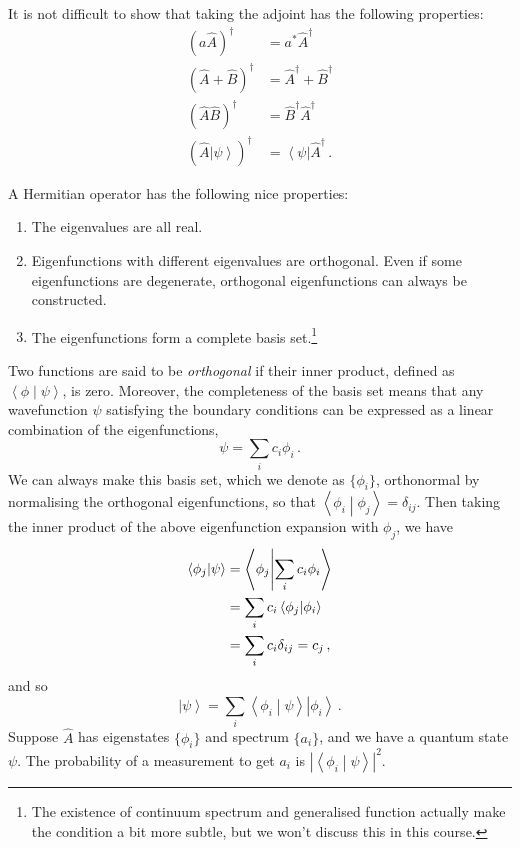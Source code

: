 \documentclass{article}
\theoremstyle{plain}\theoremheaderfont{\normalfont\itshape}\theorembodyfont{\rmfamily}\theoremseparator{.}\newtheorem*{rem}{Remark}\newtheorem*{ex}{Example}\newtheorem*{proof}{Proof}\newtheorem*{altp}{Alternative proof}
\theoremstyle{plain}\theoremheaderfont{\normalfont\bfseries}\theorembodyfont{\rmfamily}\theoremseparator{.}\newtheorem{thm}{Theorem}[section]\newtheorem{lem}[thm]{Lemma}\newtheorem{prop}[thm]{Proposition}\newtheorem*{cor}{Corollary}\newtheorem{defn}[thm]{Definition}\newtheorem{clm}[thm]{Claim}\newtheorem{clminproof}{Claim}
\theoremstyle{break}\theoremheaderfont{\normalfont\itshape}\theorembodyfont{\rmfamily}\theoremseparator{.\medskip}\newtheorem*{proofskip}{Proof}\newtheorem*{exs}{Examples}\newtheorem*{rems}{Remarks}
\theoremstyle{break}\theoremheaderfont{\normalfont\bfseries}\theorembodyfont{\rmfamily}\theoremseparator{.\medskip}\newtheorem{lemskip}[thm]{Lemma}\newtheorem{defnskip}[thm]{Definition}\newtheorem{propskip}[thm]{Proposition}\newtheorem{thmskip}[thm]{Theorem}
\numberwithin{equation}{section}
\newcommand{\bra}[1]{\left\langle #1 \right|}
\newcommand{\ket}[1]{\left| #1 \right\rangle}
\newcommand{\braket}[2]{\left\langle #1 \middle| #2 \right\rangle}
\newcommand{\abs}[1]{\left| #1 \right|}
\begin{document}
    It is not difficult to show that taking the adjoint has the following properties:
    \begin{align}
        (a\hat{A})^\dagger&=a^*\hat{A}^\dagger \\
        (\hat{A}+\hat{B})^\dagger&=\hat{A}^\dagger+\hat{B}^\dagger \\
        (\hat{A}\hat{B})^\dagger&=\hat{B}^\dagger\hat{A}^\dagger \\
        (\hat{A}\ket{\psi})^\dagger&=\bra{\psi}\hat{A}^\dagger\,.
    \end{align}

    A Hermitian operator has the following nice properties:
    \begin{enumerate}[topsep=0pt,label=(\roman*)]
        \item The eigenvalues are all real.
        \item Eigenfunctions with different eigenvalues are orthogonal. Even if some eigenfunctions are degenerate, orthogonal eigenfunctions can always be constructed.
        \item The eigenfunctions form a complete basis set.\footnote{The existence of continuum spectrum and generalised function actually make the condition a bit more subtle, but we won't discuss this in this course.}
    \end{enumerate}
    Two functions are said to be \textit{orthogonal} if their inner product, defined as \(\braket{\phi}{\psi}\), is zero. Moreover, the completeness of the basis set means that any wavefunction \(\psi\) satisfying the boundary conditions can be expressed as a linear combination of the eigenfunctions,
    \begin{equation}
        \psi=\sum_i c_i\phi_i\,.
    \end{equation}
    We can always make this basis set, which we denote as \(\{\phi_i\}\), orthonormal by normalising the orthogonal eigenfunctions, so that \(\braket{\phi_i}{\phi_j}=\delta_{ij}\). Then taking the inner product of the above eigenfunction expansion with \(\phi_j\), we have
    \begin{align}
        \braket{\phi_j}{\psi}&=\braket{\phi_j}{\sum_i c_i\phi_i}\notag\\
        &=\sum_i c_i\braket{\phi_j}{\phi_i}\notag\\
        &=\sum_i c_i\delta_{ij}=c_j\,,
    \end{align}
    and so
    \begin{equation}
        \ket{\psi}=\sum_i \braket{\phi_i}{\psi}\ket{\phi_i}\,.
    \end{equation}
    Suppose \(\hat{A}\) has eigenstates \(\{\phi_i\}\) and spectrum \(\{a_i\}\), and we have a quantum state \(\psi\). The probability of a measurement to get \(a_i\) is \(\abs{\braket{\phi_i}{\psi}}^2\).
\end{document}
